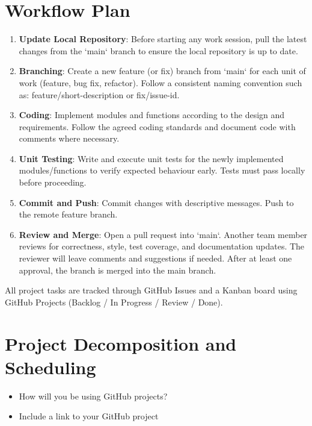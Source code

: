 \documentclass{article}
\begin{document}
\section{Workflow Plan}

\begin{enumerate}
  \item \textbf{Update Local Repository}: Before starting any work session, pull the latest changes from the `main` branch to ensure the local repository is up to date.
  \item \textbf{Branching}: Create a new feature (or fix) branch from `main` for each unit of work (feature, bug fix, refactor). Follow a consistent naming convention such as: feature/short-description or fix/issue-id.
  \item \textbf{Coding}: Implement modules and functions according to the design and requirements. Follow the agreed coding standards and document code with comments where necessary.
  \item \textbf{Unit Testing}: Write and execute unit tests for the newly implemented modules/functions to verify expected behaviour early. Tests must pass locally before proceeding.
  \item \textbf{Commit and Push}: Commit changes with descriptive messages. Push to the remote feature branch.
  \item \textbf{Review and Merge}: Open a pull request into `main`. Another team member reviews for correctness, style, test coverage, and documentation updates. The reviewer will leave comments and suggestions if needed. After at least one approval, the branch is merged into the main branch.
\end{enumerate}

All project tasks are tracked through GitHub Issues and a Kanban board using GitHub Projects (Backlog / In Progress / Review / Done).

\section{Project Decomposition and Scheduling}

\begin{itemize}
  \item How will you be using GitHub projects?
  \item Include a link to your GitHub project
\end{itemize}

\end{document}

